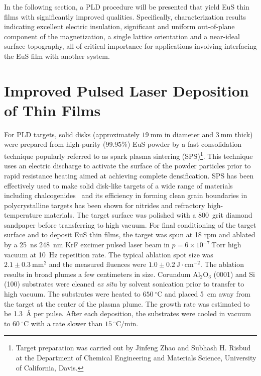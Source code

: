 In the following section, a PLD procedure will be presented that yield EuS thin films with significantly improved qualities. Specifically, characterization results indicating excellent electric insulation, significant and uniform out-of-plane component of the magnetization, a single lattice orientation and a near-ideal surface topography, all of critical importance for applications involving interfacing the EuS film with another system.

\section{Improved Pulsed Laser Deposition of Thin Films}\label{sec:EuSPLD}
For PLD targets, solid disks (approximately $19~\mathrm{mm}$ in diameter and $3~\mathrm{mm}$ thick) were prepared from high-purity (99.95\%) EuS powder by a fast consolidation technique popularly referred to as spark plasma sintering (SPS)\footnote{Target preparation was carried out by Jinfeng Zhao and Subhash H. Risbud at the Department of Chemical Engineering and Materials Science, University of California, Davis.}. This technique uses an electric discharge to activate the surface of the powder particles prior to rapid resistance heating aimed at achieving complete densification. SPS has been effectively used to make solid disk-like targets of a wide range of materials including chalcogenides~\cite{Jinfeng2, Subhash1} and its efficiency in forming clean grain boundaries in polycrystalline targets has been shown for nitrides and refractory high-temperature materials.\cite{Subhash2, Jinfeng1} The target surface was polished with a 800~grit diamond sandpaper before transferring to high vacuum. For final conditioning of the target surface and to deposit EuS thin films, the target was spun at 18 rpm and ablated by a 25~ns 248~nm KrF excimer pulsed laser beam in $p=6\times{}10^{-7}~\mathrm{Torr}$ high vacuum at 10~Hz repetition rate. The typical ablation spot size was $2.1\pm0.3~\mathrm{mm^2}$ and the measured fluences were $1.0\pm0.2~\mathrm{J\cdot{}cm^{-2}}$. The ablation results in broad plumes a few centimeters in size. Corundum Al$_2$O$_3$ (0001) and Si (100) substrates were cleaned \textit{ex situ} by solvent sonication prior to transfer to high vacuum. The substrates were heated to $650~^{\circ}\mathrm{C}$ and placed 5~cm away from the target at the center of the plasma plume. The growth rate was estimated to be 1.3~\AA{} per pulse. After each deposition, the substrates were cooled in vacuum to $60~^{\circ}\mathrm{C}$ with a rate slower than $15~^{\circ}\mathrm{C}/\mathrm{min}$.

